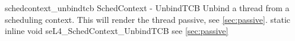 %
%
%
%

\apidoc
{schedcontext_unbindtcb}
{SchedContext - UnbindTCB}
{Unbind a thread from a scheduling context. This will render the thread passive, see \autoref{sec:passive}.}
{static inline void seL4\_SchedContext\_UnbindTCB}
{
}
{\errorenumdesc}
{see \autoref{sec:passive}}
